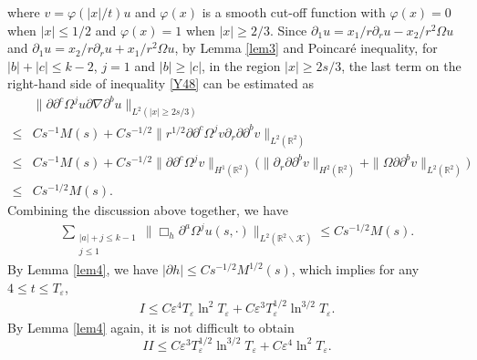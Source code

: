 \documentclass[11pt, reqno]{amsart}
\theoremstyle{definition}
\theoremstyle{remark}
\theoremstyle{definition}
\numberwithin{equation}{section}
\numberwithin{equation}{section}
\def\leq{\leqslant}
\def\geq{\geqslant}
\begin{document}
where $v=\varphi(|x|/t) u$ and $\varphi(x)$ is a smooth cut-off
function with $\varphi(x)=0$ when $|x|\leq1/2$ and $\varphi(x)=1$
when $|x|\geq2/3$. Since $\partial_1u=x_1/r\partial_ru-x_2/r^2\Omega
u$ and $\partial_1u=x_2/r\partial_ru+x_1/r^2\Omega u$, by Lemma \ref{lem3}
and Poincar\'{e} inequality, for $|b|+|c|\leq k-2$, $j=1$ and
$|b|\geq|c|$, in the region $|x|\geq2s/3$, the
last term on the right-hand side of inequality \eqref{Y48} can be
estimated as
\begin{align*}
&\|\partial\partial^c\Omega^ju\partial\nabla\partial^bu\|_{L^2(|x|\geq2s/3)}
\\\leq& Cs^{-1}M(s)+Cs^{-1/2}\|r^{1/2}\partial\partial^c\Omega^jv\partial_r\partial\partial^bv\|_{L^2(\mathbb R^2)}
\\\leq& Cs^{-1}M(s)+Cs^{-1/2}\|\partial\partial^c\Omega^jv\|_{H^1(\mathbb R^2)}\big(\|\partial_r\partial\partial^bv\|_{H^2(\mathbb R^2)}
+\|\Omega\partial\partial^bv\|_{L^2(\mathbb R^2)}\big)
\\\leq& Cs^{-1/2}M(s).
\end{align*}
Combining the discussion above together, we have
\begin{align*}
\sum_{\substack{|a|+j\leq
k-1\\j\leq1}}\|\Box_h\partial^a\Omega^ju(s,\cdot)\|_{L^2(\mathbb
R^2\backslash\mathcal {K})}\leq Cs^{-1/2}M(s).
\end{align*}
By Lemma \ref{lem4}, we have $|\partial h|\leq Cs^{-1/2}M^{1/2}(s)$, which
implies for any $4\leq t\leq T_{\varepsilon}$,
\begin{align*}
I\leq C\varepsilon^4T_{\varepsilon}\ln^2T_{\varepsilon}+C\varepsilon^{3}T^{1/2}_{\varepsilon}\ln^{3/2}T_{\varepsilon}.
\end{align*}
By Lemma \ref{lem4} again, it is not difficult to obtain 
\[II\leq
C\varepsilon^{3}T^{1/2}_{\varepsilon}\ln^{3/2}T_{\varepsilon}+C\varepsilon^4\ln^2T_{\varepsilon}.
\]
\end{document}
